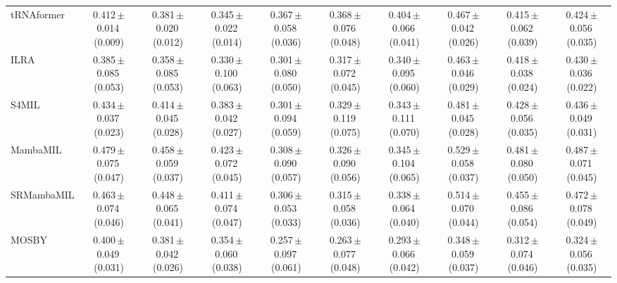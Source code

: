 \begin{tabular}{lccccccccc}
tRNAformer & 0.412\,{\tiny$\pm$}0.014\,{\tiny(0.009)} & 0.381\,{\tiny$\pm$}0.020\,{\tiny(0.012)} & 0.345\,{\tiny$\pm$}0.022\,{\tiny(0.014)} & 0.367\,{\tiny$\pm$}0.058\,{\tiny(0.036)} & 0.368\,{\tiny$\pm$}0.076\,{\tiny(0.048)} & 0.404\,{\tiny$\pm$}0.066\,{\tiny(0.041)} & 0.467\,{\tiny$\pm$}0.042\,{\tiny(0.026)} & 0.415\,{\tiny$\pm$}0.062\,{\tiny(0.039)} & 0.424\,{\tiny$\pm$}0.056\,{\tiny(0.035)}\\
ILRA & 0.385\,{\tiny$\pm$}0.085\,{\tiny(0.053)} & 0.358\,{\tiny$\pm$}0.085\,{\tiny(0.053)} & 0.330\,{\tiny$\pm$}0.100\,{\tiny(0.063)} & 0.301\,{\tiny$\pm$}0.080\,{\tiny(0.050)} & 0.317\,{\tiny$\pm$}0.072\,{\tiny(0.045)} & 0.340\,{\tiny$\pm$}0.095\,{\tiny(0.060)} & 0.463\,{\tiny$\pm$}0.046\,{\tiny(0.029)} & 0.418\,{\tiny$\pm$}0.038\,{\tiny(0.024)} & 0.430\,{\tiny$\pm$}0.036\,{\tiny(0.022)}\\
S4MIL & 0.434\,{\tiny$\pm$}0.037\,{\tiny(0.023)} & 0.414\,{\tiny$\pm$}0.045\,{\tiny(0.028)} & 0.383\,{\tiny$\pm$}0.042\,{\tiny(0.027)} & 0.301\,{\tiny$\pm$}0.094\,{\tiny(0.059)} & 0.329\,{\tiny$\pm$}0.119\,{\tiny(0.075)} & 0.343\,{\tiny$\pm$}0.111\,{\tiny(0.070)} & 0.481\,{\tiny$\pm$}0.045\,{\tiny(0.028)} & 0.428\,{\tiny$\pm$}0.056\,{\tiny(0.035)} & 0.436\,{\tiny$\pm$}0.049\,{\tiny(0.031)}\\
MambaMIL & 0.479\,{\tiny$\pm$}0.075\,{\tiny(0.047)} & 0.458\,{\tiny$\pm$}0.059\,{\tiny(0.037)} & 0.423\,{\tiny$\pm$}0.072\,{\tiny(0.045)} & 0.308\,{\tiny$\pm$}0.090\,{\tiny(0.057)} & 0.326\,{\tiny$\pm$}0.090\,{\tiny(0.056)} & 0.345\,{\tiny$\pm$}0.104\,{\tiny(0.065)} & 0.529\,{\tiny$\pm$}0.058\,{\tiny(0.037)} & 0.481\,{\tiny$\pm$}0.080\,{\tiny(0.050)} & 0.487\,{\tiny$\pm$}0.071\,{\tiny(0.045)}\\
SRMambaMIL & 0.463\,{\tiny$\pm$}0.074\,{\tiny(0.046)} & 0.448\,{\tiny$\pm$}0.065\,{\tiny(0.041)} & 0.411\,{\tiny$\pm$}0.074\,{\tiny(0.047)} & 0.306\,{\tiny$\pm$}0.053\,{\tiny(0.033)} & 0.315\,{\tiny$\pm$}0.058\,{\tiny(0.036)} & 0.338\,{\tiny$\pm$}0.064\,{\tiny(0.040)} & 0.514\,{\tiny$\pm$}0.070\,{\tiny(0.044)} & 0.455\,{\tiny$\pm$}0.086\,{\tiny(0.054)} & 0.472\,{\tiny$\pm$}0.078\,{\tiny(0.049)}\\
MOSBY & 0.400\,{\tiny$\pm$}0.049\,{\tiny(0.031)} & 0.381\,{\tiny$\pm$}0.042\,{\tiny(0.026)} & 0.354\,{\tiny$\pm$}0.060\,{\tiny(0.038)} & 0.257\,{\tiny$\pm$}0.097\,{\tiny(0.061)} & 0.263\,{\tiny$\pm$}0.077\,{\tiny(0.048)} & 0.293\,{\tiny$\pm$}0.066\,{\tiny(0.042)} & 0.348\,{\tiny$\pm$}0.059\,{\tiny(0.037)} & 0.312\,{\tiny$\pm$}0.074\,{\tiny(0.046)} & 0.324\,{\tiny$\pm$}0.056\,{\tiny(0.035)}\\

\end{tabular}
